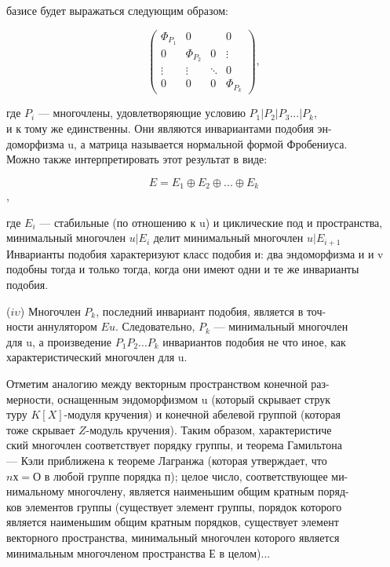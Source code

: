 \documentclass{../template/mai_book}
\begin{document}
\pagebreak

\noindent базисе будет выражаться следующим образом: 

$$\begin{pmatrix}
\Phi_{P_1} & 0 & \; & 0 \\
0 & \Phi_{P_2} & 0 & \vdots  \\
\vdots & \vdots & \ddots & 0  \\
0 & 0 & 0 & \Phi_{P_k} 
\end{pmatrix},
$$

\smallskip
 
\noindent где $P_i$ — многочлены, удовлетворяющие условию $P_1|P_2|P_3...|P_k$,\\ 
и к тому же единственны. Они являются инвариантами подобия 
эн-\\доморфизма u, а матрица называется нормальной формой Фробениуса.\\ 
Можно также интерпретировать этот результат в виде:


$$ E = E_1\oplus E_2\oplus...\oplus E_k $$,



\noindent где $E_i$ — стабильные (по отношению к u) и циклические под и 
пространства, минимальный многочлен $u|E_i$ делит минимальный 
многочлен $u|E_{i+1}$ Инварианты подобия характеризуют класс подобия и: два 
эндоморфизма и и v подобны тогда и только тогда, когда они имеют 
одни и те же инварианты подобия. 

\medskip

($\mathit{i} \upsilon $) Многочлен $P_k$, последний инвариант подобия, является в
точ-\\ности аннулятором $Eu$. Следовательно, $P_k$ — минимальный многочлен\\ 
для u, а произведение $P_1P_2... P_k$ инвариантов подобия не что иное, как 
характеристический многочлен для u. 


Отметим аналогию между векторным пространством конечной 
раз-\\мерности, оснащенным эндоморфизмом u (который скрывает 
струк\\туру $K[X]$-модуля кручения) и конечной абелевой группой (которая\\ 
тоже скрывает $Z$-модуль кручения). Таким образом, 
характеристиче\\ский многочлен соответствует порядку группы, и теорема Гамильтона\\ 
— Кэли приближена к теореме Лагранжа (которая утверждает, что\\ 
$nх = О$ в любой группе порядка п); целое число, соответствующее 
ми-\\нимальному многочлену, является наименьшим общим кратным 
поряд-\\ков элементов группы (существует элемент группы, порядок которого\\
является наименьшим общим кратным порядков, существует элемент\\ 
векторного пространства, минимальный многочлен которого является\\ 
минимальным многочленом пространства $Е$ в целом)...
\end{document}
